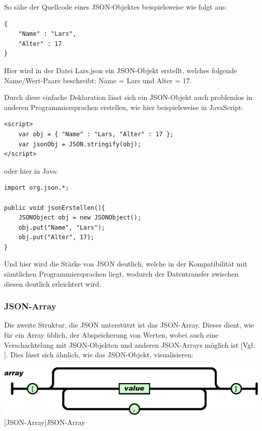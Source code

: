 \documentclass[12pt,a4paper,bibliography=totocnumbered,listof=totocnumbered]{scrartcl}
\begin{document}
So sähe der Quellcode eines JSON-Objektes beispielsweise wie folgt aus:
\\
\vspace{1em}
\begin{lstlisting}[caption=Lars.json, label=lst:json-objekt]
{
	"Name" : "Lars",
	"Alter" : 17
}
\end{lstlisting}
Hier wird in der Datei \glqq Lars.json\grqq{} ein JSON-Objekt erstellt, welches folgende Name/Wert-Paare beschreibt:
Name = Lars und Alter = 17.

Durch diese einfache Deklaration lässt sich ein JSON-Objekt auch problemlos in anderen Programmiersprachen erstellen, wie hier beispielsweise in JavaScript:
\\
\vspace{1em}
\begin{lstlisting}[caption=JSON-Objekt in JavaScript, label=lst:json-objekt1]
<script>
	var obj = { "Name" : "Lars, "Alter" : 17 };
	var jsonObj = JSON.stringify(obj);
</script>
\end{lstlisting}

\pagebreak
oder hier in Java:
\\
\vspace{1em}
\begin{lstlisting}[caption=JSON-Objekt in Java, label=lst:json-objekt2]
import org.json.*;

public void jsonErstellen(){
	JSONObject obj = new JSONObject();
	obj.put("Name", "Lars");
	obj.put("Alter", 17);
}
\end{lstlisting}

Und hier wird die Stärke von JSON deutlich, welche in der Kompatibilität mit sämtlichen Programmiersprachen liegt, wodurch der Datentransfer zwischen diesen deutlich erleichtert wird.

\subsubsection{JSON-Array}
\label{sec:JSON-Array}
Die zweite Struktur, die JSON unterstützt ist das JSON-Array.
Dieses dient, wie für ein Array üblich, der Abspeicherung von Werten, wobei auch eine Verschachtelung mit JSON-Objekten und anderen JSON-Arrays möglich ist [Vgl. \cite{json}].
Dies lässt sich ähnlich, wie das JSON-Objekt, visualisieren:

\vspace{1em}
\begin{minipage}{\linewidth}
	\centering
	\includegraphics[width=0.9\linewidth]{Bilder/json-array.png}
	[JSON-Array]{JSON-Array\footnotemark }
	\label{fig:json-array}
\end{minipage}
\end{document}
